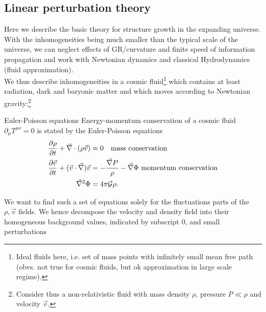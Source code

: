 \subsection{Linear perturbation theory}
Here we describe the basic theory for structure growth in the expanding universe. With the inhomogeneities being much smaller than the typical scale of the universe, we can neglect effects of GR/curvature and finite speed of information propagation and work with Newtonian dynamics and classical Hydrodynamics (fluid approximation).\\
We thus describe inhomogeneities in a cosmic fluid\footnote{Ideal fluids here, i.e. set of mass points with infinitely small mean free path (obvs. not true for cosmic fluids, but ok approximation in large scale regime).} which contains at least radiation, dark and baryonic matter and which moves according to Newtonian gravity:\footnote{Consider thus a non-relativistic fluid with mass density $\rho$, pressure $P\ll \rho$ and velocity $\vec{v}$.}
\begin{mybox}{Euler-Poisson equations}
	Energy-momentum conservation of a cosmic fluid $\partial_\mu T^{\mu \nu}=0$ is stated by the Euler-Poisson equations
	\begin{align}
		\frac{\partial \rho}{\partial t} + \vec{\nabla} \cdot (\rho \vec{v}) &= 0 \quad \text{mass conservation} \\
		\frac{\partial \vec{v}}{\partial t} + (\vec{v}\cdot \vec{\nabla}) \vec{v} &= - \frac{\vec{\nabla} P}{\rho} - \vec{\nabla}\Phi \text{  momentum conservation}\\
		\vec{\nabla}^2 \Phi &= 4 \pi \mathcal{G} \rho.
	\end{align}
\end{mybox}
We want to find such a set of equations solely for the fluctuations parts of the $\rho,\vec{v}$ fields. We hence decompose the velocity and density field into their homogeneous background values, indicated by subscript $0$, and small perturbations


